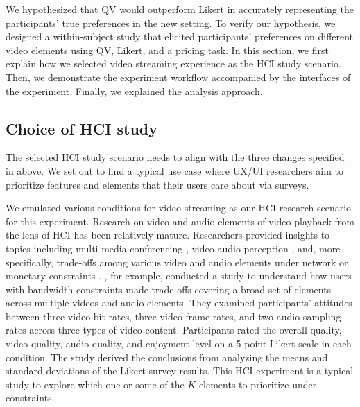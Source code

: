 We hypothesized that QV would outperform Likert in accurately representing the participants' true preferences in the new setting. To verify our hypothesis, we designed a within-subject study that elicited participants' preferences on different video elements using QV, Likert, and a pricing task. In this section, we first explain how we selected video streaming experience as the HCI study scenario. Then, we demonstrate the experiment workflow accompanied by the interfaces of the experiment. Finally, we explained the analysis approach.

 
\subsection{Choice of HCI study}
The selected HCI study scenario needs to align with the three changes specified in above. We set out to find a typical use case where UX/UI researchers aim to prioritize features and elements that their users care about via surveys. 

We emulated various conditions for video streaming as our HCI research scenario for this experiment. Research on video and audio elements of video playback from the lens of HCI has been relatively mature. Researchers provided insights to topics including multi-media conferencing \cite{watson1996evaluating}, video-audio perception \cite{chen2006cognitive, molnar2015assessing}, and, more specifically, trade-offs among various video and audio elements under network or monetary constraints \cite{molnar2013comedy, oeldorf2012bad}. \textcite{oeldorf2012bad}, for example, conducted a study to understand how users with bandwidth constraints made trade-offs covering a broad set of elements across multiple videos and audio elements. They examined participants' attitudes between three video bit rates, three video frame rates, and two audio sampling rates across three types of video content. Participants rated the overall quality, video quality, audio quality, and enjoyment level on a 5-point Likert scale in each condition. The study derived the conclusions from analyzing the means and standard deviations of the Likert survey results. This HCI experiment is a typical study to explore which one or some of the $K$ elements to prioritize under constraints.

